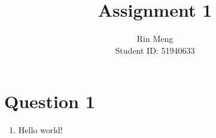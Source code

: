 \documentclass{article}
\title{Assignment 1}
\author{Rin Meng \\ Student ID: 51940633}
\begin{document}
\maketitle


\section{Question 1}
\begin{enumerate}
    \item Hello world!
	
\end{enumerate}
\end{document}
